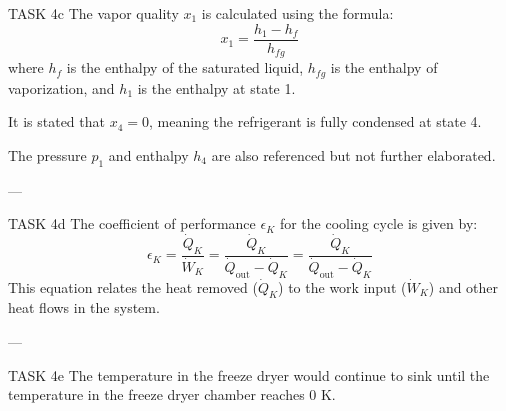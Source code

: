 TASK 4c  
The vapor quality \( x_1 \) is calculated using the formula:  
\[
x_1 = \frac{h_1 - h_f}{h_{fg}}
\]  
where \( h_f \) is the enthalpy of the saturated liquid, \( h_{fg} \) is the enthalpy of vaporization, and \( h_1 \) is the enthalpy at state 1.  

It is stated that \( x_4 = 0 \), meaning the refrigerant is fully condensed at state 4.  

The pressure \( p_1 \) and enthalpy \( h_4 \) are also referenced but not further elaborated.

---

TASK 4d  
The coefficient of performance \( \epsilon_K \) for the cooling cycle is given by:  
\[
\epsilon_K = \frac{\dot{Q}_K}{\dot{W}_K} = \frac{\dot{Q}_K}{\dot{Q}_{\text{out}} - \dot{Q}_K} = \frac{\dot{Q}_K}{\dot{Q}_{\text{out}} - \dot{Q}_K}
\]  
This equation relates the heat removed (\( \dot{Q}_K \)) to the work input (\( \dot{W}_K \)) and other heat flows in the system.

---

TASK 4e  
The temperature in the freeze dryer would continue to sink until the temperature in the freeze dryer chamber reaches 0 K.